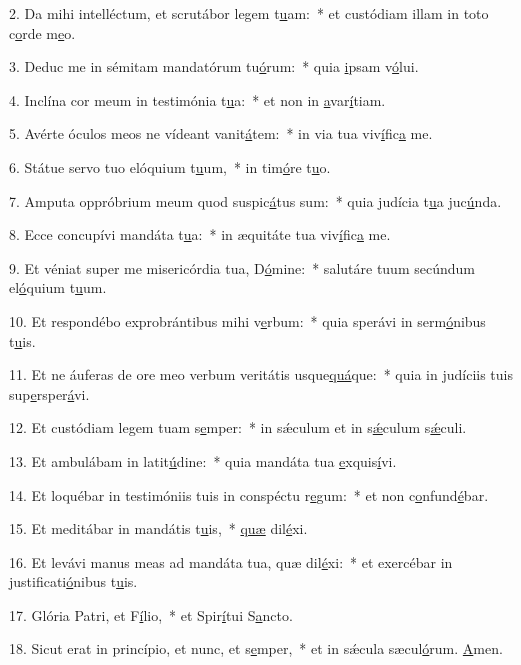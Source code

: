 2. Da mihi intelléctum, et scrutábor legem t\uline{u}am:~* et custódiam illam in toto c\uline{o}rde m\uline{e}o.\par 
3. Deduc me in sémitam mandatórum tu\uline{ó}rum:~* quia \uline{i}psam v\uline{ó}lui.\par 
4. Inclína cor meum in testimónia t\uline{u}a:~* et non in \uline{a}var\uline{í}tiam.\par 
5. Avérte óculos meos ne vídeant vanit\uline{á}tem:~* in via tua viv\uline{í}fic\uline{a} me.\par 
6. Státue servo tuo elóquium t\uline{u}um,~* in tim\uline{ó}re t\uline{u}o.\par 
7. Amputa oppróbrium meum quod suspic\uline{á}tus sum:~* quia judícia t\uline{u}a juc\uline{ú}nda.\par 
8. Ecce concupívi mandáta t\uline{u}a:~* in æquitáte tua viv\uline{í}fic\uline{a} me.\par 
9. Et véniat super me misericórdia tua, D\uline{ó}mine:~* salutáre tuum secúndum el\uline{ó}quium t\uline{u}um.\par 
10. Et respondébo exprobrántibus mihi v\uline{e}rbum:~* quia sperávi in serm\uline{ó}nibus t\uline{u}is.\par 
11. Et ne áuferas de ore meo verbum veritátis usque\uline{quá}que:~* quia in judíciis tuis sup\uline{e}rsper\uline{á}vi.\par 
12. Et custódiam legem tuam s\uline{e}mper:~* in sǽculum et in s\uline{ǽ}culum s\uline{ǽ}culi.\par 
13. Et ambulábam in latit\uline{ú}dine:~* quia mandáta tua \uline{e}xquis\uline{í}vi.\par 
14. Et loquébar in testimóniis tuis in conspéctu r\uline{e}gum:~* et non c\uline{o}nfund\uline{é}bar.\par 
15. Et meditábar in mandátis t\uline{u}is,~* \uline{quæ} dil\uline{é}xi.\par 
16. Et levávi manus meas ad mandáta tua, quæ dil\uline{é}xi:~* et exercébar in justificati\uline{ó}nibus t\uline{u}is.\par 
17. Glória Patri, et F\uline{í}lio,~* et Spir\uline{í}tui S\uline{a}ncto.\par 
18. Sicut erat in princípio, et nunc, et s\uline{e}mper,~* et in sǽcula sæcul\uline{ó}rum. \uline{A}men.\par 
